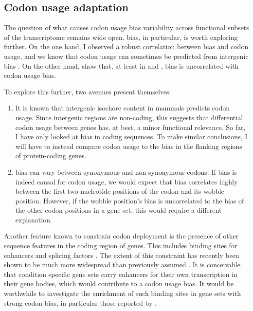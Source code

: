 \subsection{Codon usage adaptation}

The question of what causes codon usage bias variability across functional
subsets of the transcriptome remains wide open. \gc bias, in particular, is
worth exploring further. On the one hand, I observed a robust correlation
between \gc bias and codon usage, and we know that codon usage can sometimes be
predicted from intergenic \gc bias \citep{Chen:2004}. On the other hand,
\citet{Duret:2002} show that, at least in  and , \gc
bias is uncorrelated with codon usage bias.

To explore this further, two avenues present themselves:

\begin{enumerate}
    \item It is known that intergenic isochore \gc content in mammals predicts
        codon usage. Since intergenic regions are non-coding, this suggests that
        differential codon usage between genes has, at best, a minor functional
        relevance. So far, I have only looked at \gc bias in coding sequences.
        To make similar conclusions, I will have to instead compare codon usage
        to the \gc bias in the flanking regions of protein-coding genes.
    \item \gc bias can vary between synonymous and non-synonymous codons. If \gc
        bias is indeed causal for codon usage, we would expect that \gc bias
        correlates highly between the first two nucleotide positions of the
        codon and its wobble position. However, if the wobble position’s \gc
        bias is uncorrelated to the \gc bias of the other codon positions in a
        gene set, this would require a different explanation.
\end{enumerate}

Another feature known to constrain codon deployment is the presence of other
sequence features in the coding region of genes. This includes binding sites for
enhancers and splicing factors \citep{Hyder:1995,Blencowe:2000}. The extent of
this constraint has recently been shown to be much more widespread than
previously assumed \citep{Stergachis:2013}. It is conceivable that condition
specific gene sets carry enhancers for their own transcription in their gene
bodies, which would contribute to a codon usage bias. It would be worthwhile to
investigate the enrichment of such binding sites in gene sets with strong codon
bias, in particular those reported by \citep{Gingold:2014}.

